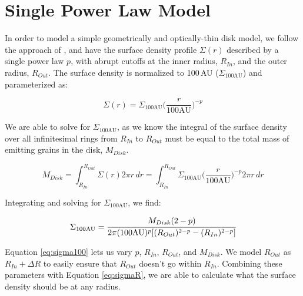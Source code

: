 


\section{Single Power Law Model}
\label{SinglePowerSED_Model}

In order to model a simple geometrically and optically-thin disk model, we follow the approach of \cite{Rica13}, and have the surface density profile $\Sigma(r)$ described by a single power law $p$, with abrupt cutoffs at the inner radius, $R_{In}$, and the outer radius, $R_{Out}$. The surface density is normalized to 100\,AU ($\Sigma_{100\text{AU}}$) and parameterized as:

\begin{equation}\label{eq:sigmaR}
\Sigma(r) = \Sigma_{100\text{AU}}\Big(\frac{r}{100\text{AU}}\Big)^{-p}
\end{equation}

We are able to solve for $\Sigma_{100\text{AU}}$, as we know the integral of the surface density over all infinitesimal rings from $R_{In}$ to $R_{Out}$ must be equal to the total mass of emitting grains in the disk, $M_{Disk}$. 

\begin{equation}\label{eq:mdisk}
M_{Disk} = \int_{R_{In}}^{R_{Out}} \Sigma(r) 2 \pi r \,dr = \int_{R_{In}}^{R_{Out}} \Sigma_{100\text{AU}}\Big(\frac{r}{100\text{AU}}\Big)^{-p} 2 \pi r \,dr
\end{equation}

Integrating and solving for $\Sigma_{100\text{AU}}$, we find:

\begin{equation}\label{eq:sigma100}
\Sigma_{100\text{AU}} = \cfrac{M_{Disk} (2 - p)}{2\pi (100\text{AU})^{p} [(R_{Out})^{2-p}-(R_{In})^{2-p}]}
\end{equation}

Equation \ref{eq:sigma100} lets us vary $p$, $R_{In}$, $R_{Out}$, and $M_{Disk}$. We model $R_{Out}$ as $R_{In} + \Delta R$ to easily ensure that $R_{Out}$ doesn't go within $R_{In}$. Combining these parameters with Equation \ref{eq:sigmaR}, we are able to calculate what the surface density should be at any radius. 

